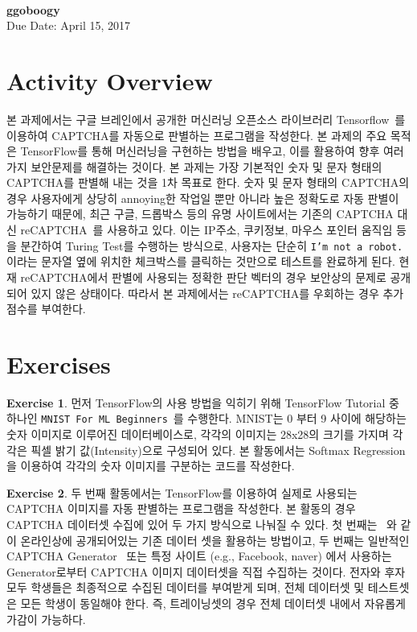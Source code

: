 \documentclass[a4paper, 11pt]{article}
\theoremstyle{definition}
\newtheorem{exercise}{Exercise}
\begin{document}
 \\
         {\phantom{} \hfill \textbf{ggoboogy}} \\
         {\phantom{} \hfill Due Date: April 15, 2017} \\

\section{Activity Overview}
본 과제에서는 구글 브레인에서 공개한 머신러닝 오픈소스 라이브러리 Tensorflow~\cite{tensorflow}를 이용하여 CAPTCHA를 자동으로 판별하는 프로그램을 작성한다. 
본 과제의 주요 목적은 TensorFlow를 통해 머신러닝을 구현하는 방법을 배우고, 이를 활용하여 향후 여러가지 보안문제를 해결하는 것이다. 
본 과제는 가장 기본적인 숫자 및 문자 형태의 CAPTCHA를 판별해 내는 것을 1차 목표로 한다. 
숫자 및 문자 형태의 CAPTCHA의 경우 사용자에게 상당히 annoying한 작업일 뿐만 아니라 높은 정확도로 자동 판별이 가능하기 때문에, 
최근 구글, 드롭박스 등의 유명 사이트에서는 기존의 CAPTCHA 대신 reCAPTCHA~\cite{recaptcha}를 사용하고 있다. 
이는 IP주소, 쿠키정보, 마우스 포인터 움직임 등을 분간하여 Turing Test를 수행하는 방식으로, 
사용자는 단순히 \texttt{I'm not a robot.} 이라는 문자열 옆에 위치한 체크박스를 클릭하는 것만으로 테스트를 완료하게 된다.
현재 reCAPTCHA에서 판별에 사용되는 정확한 판단 벡터의 경우 보안상의 문제로 공개되어 있지 않은 상태이다. 
따라서 본 과제에서는 reCAPTCHA를 우회하는 경우 추가점수를 부여한다. 

\section{Exercises}

\begin{exercise}
먼저 TensorFlow의 사용 방법을 익히기 위해 TensorFlow Tutorial 중 하나인 \texttt{MNIST For ML Beginners}~\cite{tftutorial}를 수행한다. 
MNIST는 0 부터 9 사이에 해당하는 숫자 이미지로 이루어진 데이터베이스로, 
각각의 이미지는 28x28의 크기를 가지며 각각은 픽셀 밝기 값(Intensity)으로 구성되어 있다. 
본 활동에서는 Softmax Regression을 이용하여 각각의 숫자 이미지를 구분하는 코드를 작성한다. 
\end{exercise}

\begin{exercise}
두 번째 활동에서는 TensorFlow를 이용하여 실제로 사용되는 CAPTCHA 이미지를 자동 판별하는 프로그램을 작성한다. 
본 활동의 경우 CAPTCHA 데이터셋 수집에 있어 두 가지 방식으로 나눠질 수 있다. 
첫 번째는 ~\cite{captchaset}와 같이 온라인상에 공개되어있는 기존 데이터 셋을 활용하는 방법이고, 
두 번째는 일반적인 CAPTCHA Generator~\cite{generator1, generator2, generator3} 또는 
특정 사이트 (e.g., Facebook, naver) 에서 사용하는 Generator로부터 CAPTCHA 이미지 데이터셋을 직접 수집하는 것이다.
전자와 후자 모두 학생들은 최종적으로 수집된 데이터를 부여받게 되며, 전체 데이터셋 및 테스트셋은 모든 학생이 동일해야 한다.
즉, 트레이닝셋의 경우 전체 데이터셋 내에서 자유롭게 가감이 가능하다. 
\end{exercise} 
\end{document}
